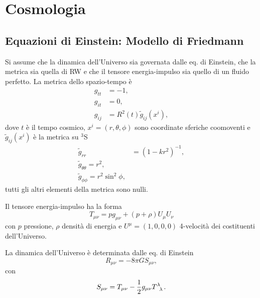 \chapter{Cosmologia}
\label{cha:cosmologia}

\section{Equazioni di Einstein: Modello di Friedmann}

Si assume che la dinamica dell'Universo sia governata dalle eq. di Einstein, che
la metrica sia quella di RW e che il tensore energia-impulso sia quello di un
fluido perfetto.  La metrica dello spazio-tempo è
\begin{subequations}
  \label{rw1}
  \begin{align}
    g_{tt} &=-1, \\
    g_{it} &= 0, \\
    g_{ij} &= R^2(t) \tilde{g}_{ij}(x^i),
  \end{align}
\end{subequations}
dove $t$ è il tempo cosmico, $x^{i} = (r,\theta,\phi)$ sono coordinate sferiche
coomoventi e $\tilde{g}_{ij}(x^i)$ è la metrica su $^{3}$S
\begin{subequations}
  \label{rw2}
  \begin{align}
    \tilde{g}_{rr} &= (1-kr^2)^{-1}, \\
    \tilde{g}_{\theta \theta} = r^2, \\
    \tilde{g}_{\phi \phi} = r^2 \sin^2 \phi,
  \end{align}
\end{subequations}
tutti gli altri elementi della metrica sono nulli.

Il tensore energia-impulso ha la forma
\begin{equation}
  T_{\mu\nu} = p g_{\mu\nu} + (p+\rho) U_{\mu} U_{\nu}
  \label{fp}
\end{equation}
con $p$ pressione, $\rho$ densità di energia e $U^{\mu}=(1,0,0,0)$ 4-velocità
dei costituenti dell'Universo.

La dinamica dell'Universo è determinata dalle eq. di Einstein
\begin{equation}
  R_{\mu\nu} =-8\pi GS_{\mu \nu},
\end{equation}
con
\begin{equation}
  S_{\mu \nu}=T_{\mu \nu}-\frac{1}{2} g_{\mu \nu} \tensor{T}{^{\lambda}_{\lambda}}.
\end{equation}

